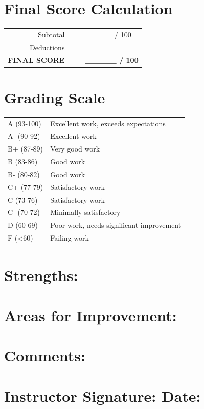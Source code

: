 \documentclass[11pt]{article}
\begin{document}
\section*{Final Score Calculation}

\begin{center}
\begin{tabular}{rcl}
Subtotal & = & \_\_\_\_\_ / 100 \\
Deductions & = & \_\_\_\_\_ \\
\midrule
\textbf{FINAL SCORE} & \textbf{=} & \textbf{\_\_\_\_\_ / 100} \\
\end{tabular}
\end{center}

\section*{Grading Scale}

\begin{tabular}{ll}
A (93-100) & Excellent work, exceeds expectations \\
A- (90-92) & Excellent work \\
B+ (87-89) & Very good work \\
B (83-86) & Good work \\
B- (80-82) & Good work \\
C+ (77-79) & Satisfactory work \\
C (73-76) & Satisfactory work \\
C- (70-72) & Minimally satisfactory \\
D (60-69) & Poor work, needs significant improvement \\
F (<60) & Failing work \\
\end{tabular}

\section*{Strengths:}
\vspace{2cm}

\section*{Areas for Improvement:}
\vspace{2cm}

\section*{Comments:}
\vspace{3cm}

\section*{Instructor Signature: \underline{\hspace{5cm}} Date: \underline{\hspace{3cm}}}
\end{document}
